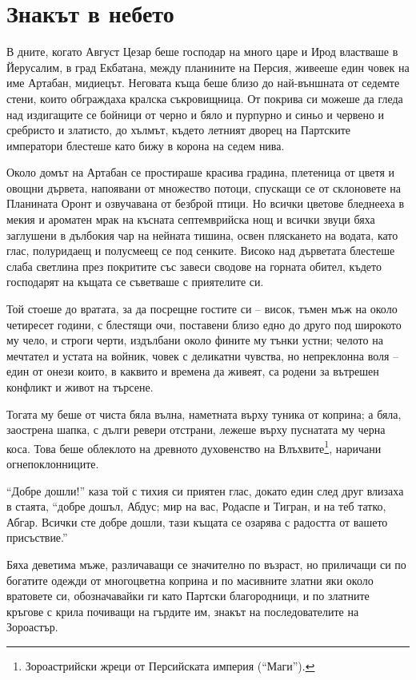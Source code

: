\documentclass[oneside,10pt]{memoir}
\begin{document}
\newpage

\part{Знакът в небето}

В дните, когато Август Цезар беше господар на много царе и Ирод властваше в
Йерусалим, в град Екбатана, между планините на Персия, живееше един човек на име
Артабан, мидиецът. Неговата къща беше близо до най-външната от седемте стени,
които обграждаха кралска съкровищница. От покрива си можеше да гледа над
издигащите се бойници от черно и бяло и пурпурно и синьо и червено и сребристо и
златисто, до хълмът, където летният дворец на Партските императори блестеше като
бижу в корона на седем нива.

Около домът на Артабан се простираше красива градина, плетеница от цветя и
овощни дървета, напоявани от множество потоци, спускащи се от склоновете на
Планината Оронт и озвучавана от безброй птици. Но всички цветове бледнееха в
мекия и ароматен мрак на късната септемврийска нощ и всички звуци бяха заглушени
в дълбокия чар на нейната тишина, освен пляскането на водата, като глас,
полуридаещ и полусмеещ се под сенките. Високо над дърветата блестеше слаба
светлина през покритите със завеси сводове на горната обител, където господарят
на къщата се съветваше с приятелите си.

Той стоеше до вратата, за да посрещне гостите си -- висок, тъмен мъж на около
четиресет години, с блестящи очи, поставени близо едно до друго под широкото му
чело, и строги черти, издълбани около фините му тънки устни; челото на мечтател
и устата на войник, човек с деликатни чувства, но непреклонна воля -- един от
онези които, в каквито и времена да живеят, са родени за вътрешен конфликт и
живот на търсене.

Тогата му беше от чиста бяла вълна, наметната върху туника от коприна; а бяла,
заострена шапка, с дълги ревери отстрани, лежеше върху пуснатата му черна коса.
Това беше облеклото на древното духовенство на Влъхвите\footnote{Зороастрийски
жреци от Персийската империя (``Маги'').}, наричани огнепоклонниците.

``Добре дошли!'' каза той с тихия си приятен глас, докато един след друг влизаха
в стаята, ``добре дошъл, Абдус; мир на вас, Родаспе и Тигран, и на теб татко,
Абгар. Всички сте добре дошли, тази къщата се озарява с радостта от вашето
присъствие.''

Бяха деветима мъже, различаващи се значително по възраст, но приличащи си по
богатите одежди от многоцветна коприна и по масивните златни яки около вратовете
си, обозначавайки ги като Партски благородници, и по златните кръгове с крила
почиващи на гърдите им, знакът на последователите на Зороастър.
\end{document}
